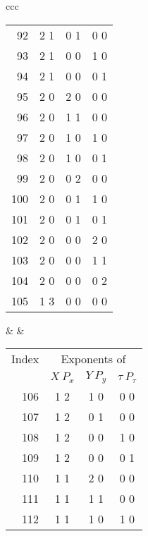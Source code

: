 {\begin{center}
\begin{tabular}{ccc}
\begin{tabular}{rccc}
92\hspace*{.125in}&2 1&0 1&0 0\\
93\hspace*{.125in}&2 1&0 0&1 0\\
94\hspace*{.125in}&2 1&0 0&0 1\\
95\hspace*{.125in}&2 0&2 0&0 0\\
96\hspace*{.125in}&2 0&1 1&0 0\\
97\hspace*{.125in}&2 0&1 0&1 0\\
98\hspace*{.125in}&2 0&1 0&0 1\\
99\hspace*{.125in}&2 0&0 2&0 0\\
100\hspace*{.125in}&2 0&0 1&1 0\\
101\hspace*{.125in}&2 0&0 1&0 1\\
102\hspace*{.125in}&2 0&0 0&2 0\\
103\hspace*{.125in}&2 0&0 0&1 1\\
104\hspace*{.125in}&2 0&0 0&0 2\\
105\hspace*{.125in}&1 3&0 0&0 0
\end{tabular} & \hspace*{1in} &
\begin{tabular}{rccc}
\multicolumn{1}{c}{Index} &
\multicolumn{3}{c}{Exponents of}\\
&$X\:P_x$&$Y\:P_y$&$\tau\:P_\tau$\\
106\hspace*{.125in}&1 2&1 0&0 0\\
107\hspace*{.125in}&1 2&0 1&0 0\\
108\hspace*{.125in}&1 2&0 0&1 0\\
109\hspace*{.125in}&1 2&0 0&0 1\\
110\hspace*{.125in}&1 1&2 0&0 0\\
111\hspace*{.125in}&1 1&1 1&0 0\\
112\hspace*{.125in}&1 1&1 0&1 0\\

\end{tabular}
\end{tabular}
\end{center}}
